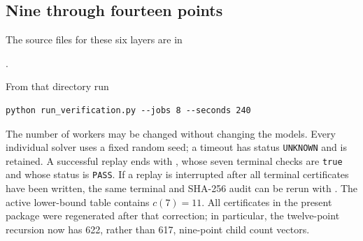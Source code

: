 \subsection{Nine through fourteen points}

The source files for these six layers are in
\begin{center}
.
\end{center}
From that directory run
\begin{verbatim}
python run_verification.py --jobs 8 --seconds 240
\end{verbatim}
The number of workers may be changed without changing the models.  Every
individual solver uses a fixed random seed; a timeout has status
\texttt{UNKNOWN} and is retained.  A successful replay ends with
, whose seven terminal checks are
\texttt{true} and whose status is \texttt{PASS}.  If a replay is interrupted
after all terminal certificates have been written, the same terminal and
SHA-256 audit can be rerun with .
The active lower-bound table contains $c(7)=11$.  All certificates in the
present package were regenerated after that correction; in particular, the
twelve-point recursion now has 622, rather than 617, nine-point child
count vectors.

